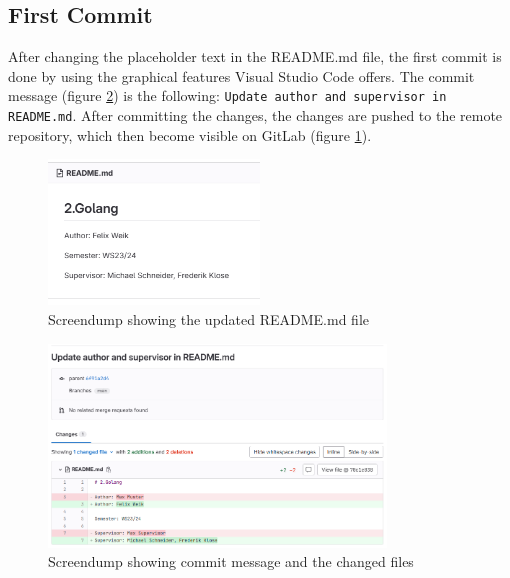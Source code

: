 \subsection{First Commit}
After changing the placeholder text in the README.md file, the first commit is done by using the graphical features Visual Studio Code offers.
The commit message (figure \ref*{fig:screendump_readmeCommitMessage}) is the following: \texttt{Update author and supervisor in README.md}.
After committing the changes, the changes are pushed to the remote repository, which then become visible on GitLab (figure \ref*{fig:screendump_readme}).

\begin{figure}[h]
    \centering
    \includegraphics[width=0.5\textwidth]{figures/goLang/golang_screendumpReadme.png}
    \caption{Screendump showing the updated README.md file}
    \label{fig:screendump_readme}
\end{figure}

\begin{figure}[h]
    \centering
    \includegraphics[width=0.8\textwidth]{figures/goLang/golang_screendumpReadmeCommit.png}
    \caption{Screendump showing commit message and the changed files}
    \label{fig:screendump_readmeCommitMessage}
\end{figure}